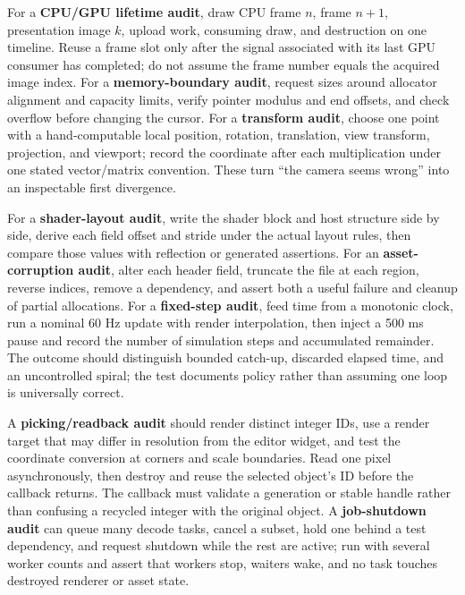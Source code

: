 For a \textbf{CPU/GPU lifetime audit}, draw CPU frame \(n\), frame \(n+1\), presentation image \(k\), upload work, consuming draw, and destruction on one timeline. Reuse a frame slot only after the signal associated with its last GPU consumer has completed; do not assume the frame number equals the acquired image index. For a \textbf{memory-boundary audit}, request sizes around allocator alignment and capacity limits, verify pointer modulus and end offsets, and check overflow before changing the cursor. For a \textbf{transform audit}, choose one point with a hand-computable local position, rotation, translation, view transform, projection, and viewport; record the coordinate after each multiplication under one stated vector/matrix convention. These turn ``the camera seems wrong'' into an inspectable first divergence.

For a \textbf{shader-layout audit}, write the shader block and host structure side by side, derive each field offset and stride under the actual layout rules, then compare those values with reflection or generated assertions. For an \textbf{asset-corruption audit}, alter each header field, truncate the file at each region, reverse indices, remove a dependency, and assert both a useful failure and cleanup of partial allocations. For a \textbf{fixed-step audit}, feed time from a monotonic clock, run a nominal 60 Hz update with render interpolation, then inject a 500 ms pause and record the number of simulation steps and accumulated remainder. The outcome should distinguish bounded catch-up, discarded elapsed time, and an uncontrolled spiral; the test documents policy rather than assuming one loop is universally correct.

A \textbf{picking/readback audit} should render distinct integer IDs, use a render target that may differ in resolution from the editor widget, and test the coordinate conversion at corners and scale boundaries. Read one pixel asynchronously, then destroy and reuse the selected object's ID before the callback returns. The callback must validate a generation or stable handle rather than confusing a recycled integer with the original object. A \textbf{job-shutdown audit} can queue many decode tasks, cancel a subset, hold one behind a test dependency, and request shutdown while the rest are active; run with several worker counts and assert that workers stop, waiters wake, and no task touches destroyed renderer or asset state.


